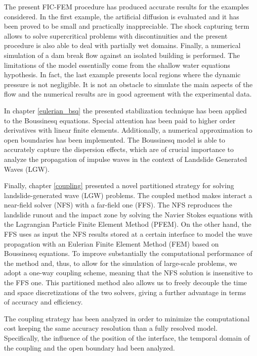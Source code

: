 The present FIC-FEM procedure has produced accurate results for the examples considered.
In the first example, the artificial diffusion is evaluated and it has been proved to be small and practically inappreciable. The shock capturing term allows to solve supercritical problems with discontinuities and the present procedure is also able to deal with partially wet domains. Finally, a numerical simulation of a dam break flow against an isolated building is performed.
The limitations of the model essentially come from the shallow water equations hypothesis. In fact, the last example presents local regions where the dynamic pressure is not negligible. It is not an obstacle to simulate the main aspects of the flow and the numerical results are in good agreement with the experimental data.

In chapter \ref{eulerian_bsq} the presented stabilization technique has been applied to the Boussinesq equations. Special attention has been paid to higher order derivatives with linear finite elements. Additionally, a numerical approximation to open boundaries has been implemented. The Boussinesq model is able to accurately capture the dispersion effects, which are of crucial importance to analyze the propagation of impulse waves in the context of Landslide Generated Waves (LGW).

Finally, chapter \ref{coupling} presented a novel partitioned strategy for solving landslide-generated wave (LGW) problems. The coupled method makes interact a near-field solver (NFS) with a far-field one (FFS). The NFS reproduces the landslide runout and the impact zone by solving the Navier Stokes equations with the Lagrangian Particle Finite Element Method (PFEM). On the other hand, the FFS uses as input the NFS results stored at a certain interface to model the wave propagation with an Eulerian Finite Element Method (FEM) based on Boussinesq equations. To improve substantially the computational performance of the method and, thus, to allow for the simulation of large-scale problems, we adopt a one-way coupling scheme, meaning that the NFS solution is insensitive to the FFS one. This partitioned method also allows us to freely decouple the time and space discretizations of the two solvers, giving a further advantage in terms of accuracy and efficiency.

The coupling strategy has been analyzed in order to minimize the computational cost keeping the same accuracy resolution than a fully resolved model. Specifically, the influence of the position of the interface, the temporal domain of the coupling and the open boundary had been analyzed.

